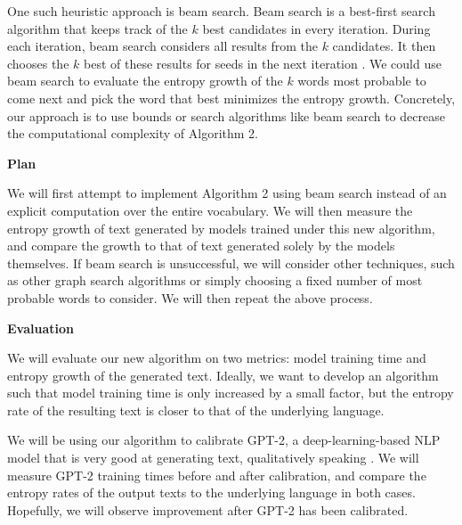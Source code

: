 \documentclass[12pt]{extarticle}
\begin{document}
One such heuristic approach is beam search. Beam search is a best-first search algorithm that keeps track of the $k$ best candidates in every iteration. During each iteration, beam search considers all results from the $k$ candidates. It then chooses the $k$ best of these results for seeds in the next iteration \cite{beam-search}. We could use beam search to evaluate the entropy growth of the $k$ words most probable to come next and pick the word that best minimizes the entropy growth. Concretely, our approach is to use bounds or search algorithms like beam search to decrease the computational complexity of Algorithm 2.

{\large \textbf{Plan}}

We will first attempt to implement Algorithm 2 using beam search instead of an explicit computation over the entire vocabulary. We will then measure the entropy growth of text generated by models trained under this new algorithm, and compare the growth to that of text generated solely by the models themselves. If beam search is unsuccessful, we will consider other techniques, such as other graph search algorithms or simply choosing a fixed number of most probable words to consider. We will then repeat the above process.

{\large \textbf{Evaluation}}

We will evaluate our new algorithm on two metrics: model training time and entropy growth of the generated text. Ideally, we want to develop an algorithm such that model training time is only increased by a small factor, but the entropy rate of the resulting text is closer to that of the underlying language. 

We will be using our algorithm to calibrate GPT-2, a deep-learning-based NLP model that is very good at generating text, qualitatively speaking \cite{radford2019language}. We will measure GPT-2 training times before and after calibration, and compare the entropy rates of the output texts to the underlying language in both cases. Hopefully, we will observe improvement after GPT-2 has been calibrated.



\end{document}
